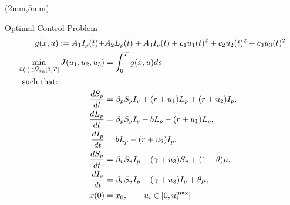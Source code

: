 \begin{frame}[plain]
\begin{textblock*}{120mm}(2mm,5mm)
    \begin{yellowbox}{Optimal Control Problem}%
        \begin{align*}
             g(x, u)
                :=
                     A_1 I_p(t) + & A_2 L_p(t) + A_3 I_v(t) %
                    + c_1 u_1(t)^2 + c_2 u_2(t)^2 + c_3 u_3(t)^2 
             \\
             \min_{\bar{u}(\cdot)\in  
                \tilde{\mathcal{U}}_{x_0}[0,T]}
%                
                J(u_1,u_2,u_3)
                &= \int_{0}^T g(x,u) ds
               \\
    \text{such that:} \hspace{2cm}& \omit\hfil
               \\
        \frac{dS_p}{dt} &=
            \beta_p S_p I_v +(r +u_1)L_p + (r + u_2) I_p,
        \\
        \frac{dL_p}{dt} &=
            \beta_p S_p I_v -b L_p -(r + u_1)L_p,
        \\
        \frac{dI_p}{dt} &= 
            b L_p - (r + u_2) I_p,
        \\
        \frac{dS_v}{dt} &=
            \beta_v S_v I_p - (\gamma+u_3) S_v +(1-\theta)\mu,
        \\
        \frac{dI_v}{dt} &=
            \beta_v S_v I_p -(\gamma+u_3) I_v +\theta\mu,
        \\
        x(0) &= x_0, \qquad 
        u_i \in [0, u_i^{\max}]
        \end{align*}
    \end{yellowbox}
\end{textblock*}
\end{frame}
